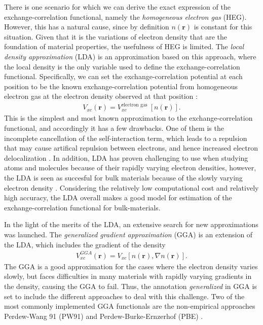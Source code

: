 There is one scenario for which we can derive the exact expression of the exchange-correlation functional, namely the \textit{homogeneous electron gas} (HEG). However, this has a natural cause, since by definition $n(\boldsymbol{r})$ is constant for this situation. Given that it is the variations of electron density that are the foundation of material properties, the usefulness of HEG is limited. The \textit{local density approximation} (LDA) is an approximation based on this approach, where the local density is the only variable used to define the exchange-correlation functional. Specifically, we can set the exchange-correlation potential at each position to be the known exchange-correlation potential from homogeneous electron gas at the electron density observed at that position \cite{Kohn1965}:
\begin{align}
  V_{xc}(\boldsymbol{r}) = V_{xc}^{\text{electron gas }}\left[n(\boldsymbol{r})\right].
\end{align}
This is the simplest and most known approximation to the exchange-correlation functional, and accordingly it has a few drawbacks. One of them is the incomplete cancellation of the self-interaction term, which leads to a repulsion that may cause artifical repulsion between electrons, and hence increased electron delocalization \cite{Allen2014}. In addition, LDA has proven challenging  to use when studying atoms and molecules because of their rapidly varying electron densities, however, the LDA is seen as succesful for bulk materials because of the slowly varying electron density \cite{DavidSholl2009}. Considering the relatively low computational cost and relatively high accuracy, the LDA overall makes a good model for estimation of the exchange-correlation functional for bulk-materials.

In the light of the merits of the LDA, an extensive search for new approximations was launched. The \textit{generalized gradient approximation} (GGA) is an extension of the LDA, which includes the gradient of the density
\begin{align}
  V_{xc}^{GGA}(\boldsymbol{r}) = V_{xc}\left[ n(\boldsymbol{r}), \nabla n (\boldsymbol{r})\right].
\end{align}
The GGA is a good approximation for the cases where the electron density varies slowly, but faces difficulties in many materials with rapidly varying gradients in the density, causing the GGA to fail. Thus, the annotation \textit{generalized} in GGA is set to include the different approaches to deal with this challenge. Two of the most commonly implemented GGA functionals are the non-empirical approaches Perdew-Wang 91 (PW91) \cite{Perdew1992} and Perdew-Burke-Ernzerhof (PBE) \cite{Perdew1996}.


